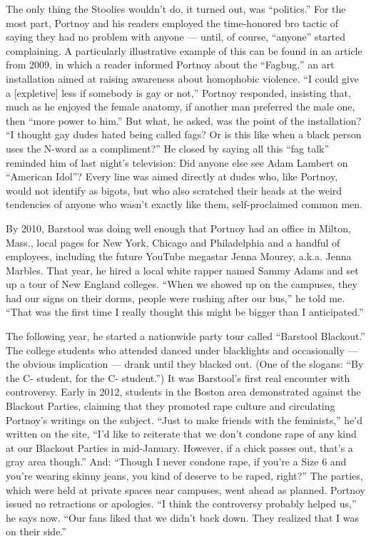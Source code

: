 The only thing the Stoolies wouldn't do, it turned out, was
``politics.'' For the most part, Portnoy and his readers employed the
time-honored bro tactic of saying they had no problem with anyone ---
until, of course, ``anyone'' started complaining. A particularly
illustrative example of this can be found in an article from 2009, in
which a reader informed Portnoy about the ``Fagbug,'' an art
installation aimed at raising awareness about homophobic violence. ``I
could give a {[}expletive{]} less if somebody is gay or not,'' Portnoy
responded, insisting that, much as he enjoyed the female anatomy, if
another man preferred the male one, then ``more power to him.'' But
what, he asked, was the point of the installation? ``I thought gay dudes
hated being called fags? Or is this like when a black person uses the
N-word as a compliment?'' He closed by saying all this ``fag talk''
reminded him of last night's television: Did anyone else see Adam
Lambert on ``American Idol''? Every line was aimed directly at dudes
who, like Portnoy, would not identify as bigots, but who also scratched
their heads at the weird tendencies of anyone who wasn't exactly like
them, self-proclaimed common men.

By 2010, Barstool was doing well enough that Portnoy had an office in
Milton, Mass., local pages for New York, Chicago and Philadelphia and a
handful of employees, including the future YouTube megastar Jenna
Mourey, a.k.a. Jenna Marbles. That year, he hired a local white rapper
named Sammy Adams and set up a tour of New England colleges. ``When we
showed up on the campuses, they had our signs on their dorms, people
were rushing after our bus,'' he told me. ``That was the first time I
really thought this might be bigger than I anticipated.''

The following year, he started a nationwide party tour called ``Barstool
Blackout.'' The college students who attended danced under blacklights
and occasionally --- the obvious implication --- drank until they
blacked out. (One of the slogans: ``By the C- student, for the C-
student.'') It was Barstool's first real encounter with controversy.
Early in 2012, students in the Boston area demonstrated against the
Blackout Parties, claiming that they promoted rape culture and
circulating Portnoy's writings on the subject. ``Just to make friends
with the feminists,'' he'd written on the site, ``I'd like to reiterate
that we don't condone rape of any kind at our Blackout Parties in
mid-January. However, if a chick passes out, that's a gray area
though.'' And: ``Though I never condone rape, if you're a Size 6 and
you're wearing skinny jeans, you kind of deserve to be raped, right?''
The parties, which were held at private spaces near campuses, went ahead
as planned. Portnoy issued no retractions or apologies. ``I think the
controversy probably helped us,'' he says now. ``Our fans liked that we
didn't back down. They realized that I was on their side.''

